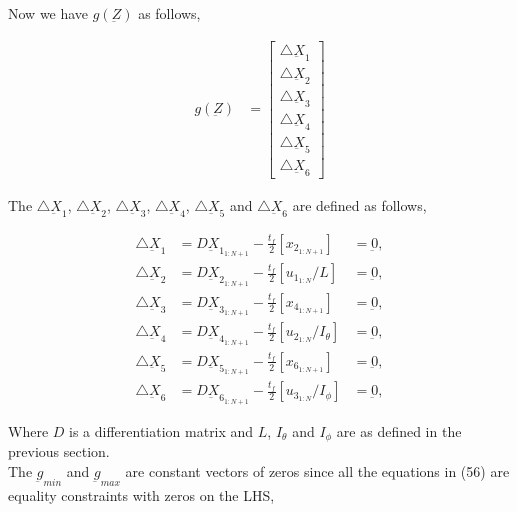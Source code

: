 \documentclass[11pt,usenames]{article}
\begin{document}
	Now we have $g( \underbar Z )$ as follows,
	
	\begin{align}
	g( \underbar Z ) &= 
	\begin{bmatrix}
	\bigtriangleup \underbar X_{1} \\  \bigtriangleup \underbar X_{2} \\ \bigtriangleup \underbar X_{3} \\  \bigtriangleup \underbar X_{4} \\  \bigtriangleup \underbar X_{5} \\  \bigtriangleup \underbar X_{6}
	\end{bmatrix}
	\end{align}
	
	The $\bigtriangleup \underbar X_{1}$, $\bigtriangleup \underbar X_{2}$, $\bigtriangleup \underbar X_{3}$, $\bigtriangleup \underbar X_{4}$, $\bigtriangleup \underbar X_{5}$ and $\bigtriangleup \underbar X_{6}$ are defined as follows,
	
	\begin{align}
	\bigtriangleup \underbar X_{1} &= D \underbar X_{1_{1:N+1} } - \frac{t_{f}}{2} \left[ x_{2_{1:N+1}} \right] &= \underbar 0, \nonumber \\
	\bigtriangleup \underbar X_{2} &= D \underbar X_{2_{1:N+1}} - \frac{t_{f}}{2} \left[ u_{1_{1:N}}/L \right]  &= \underbar 0, \nonumber \\
	\bigtriangleup \underbar X_{3} &= D \underbar X_{3_{1:N+1}} - \frac{t_{f}}{2} \left[ x_{4_{1:N+1}} \right]   &= \underbar 0,  \\
	\bigtriangleup \underbar X_{4} &= D \underbar X_{4_{1:N+1}} - \frac{t_{f}}{2} \left[ u_{2_{1:N}}/I_{\theta} \right]  &= \underbar 0, \nonumber \\ 
	\bigtriangleup \underbar X_{5} &= D \underbar X_{5_{1:N+1}} - \frac{t_{f}}{2} \left[ x_{6_{1:N+1}} \right]  &= \underbar 0, \nonumber \\
	\bigtriangleup \underbar X_{6} &= D \underbar X_{6_{1:N+1}} - \frac{t_{f}}{2} \left[ u_{3_{1:N}}/I_{\phi} \right]  &= \underbar 0, \nonumber 
	\end{align}
	
	Where $D$ is a differentiation matrix and $L$, $I_{\theta}$ and $I_{\phi}$ are as defined in the previous section.\\
	
	The $ \underbar g_{min}$ and $ \underbar g_{max} $ are constant vectors of zeros since all the equations in (56) are equality constraints with zeros on the LHS, \\
	
\end{document}
